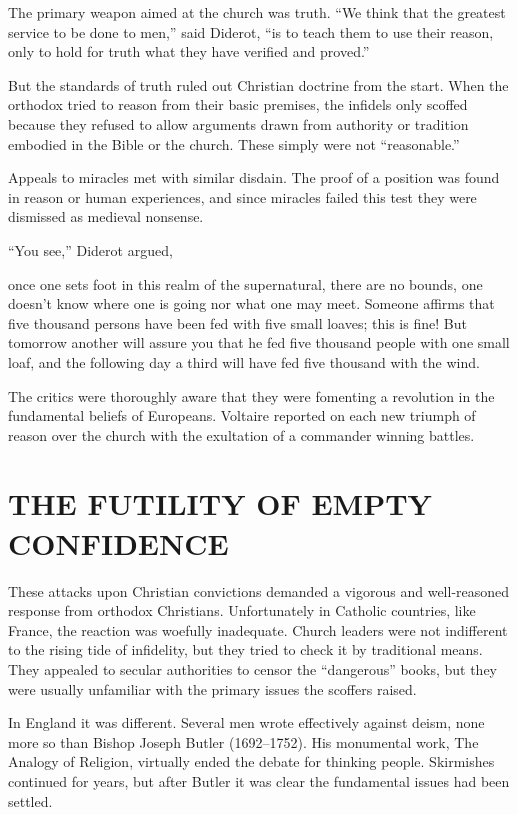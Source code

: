The primary weapon aimed at the church was truth. “We think that the greatest service to be done to
men,” said Diderot, “is to teach them to use their reason, only to hold for truth what they have
verified and proved.”

But the standards of truth ruled out Christian doctrine from the start. When the orthodox tried to
reason from their basic premises, the infidels only scoffed because they refused to allow arguments
drawn from authority or tradition embodied in the Bible or the church. These simply were not
“reasonable.”

Appeals to miracles met with similar disdain. The proof of a position was found in reason or human
experiences, and since miracles failed this test they were dismissed as medieval nonsense.

“You see,” Diderot argued,

\begin{blockquote}
once one sets foot in this realm of the supernatural, there are no bounds, one doesn’t know where
one is going nor what one may meet. Someone affirms that five thousand persons have been fed with
five small loaves; this is fine! But tomorrow another will assure you that he fed five thousand
people with one small loaf, and the following day a third will have fed five thousand with the wind.
\end{blockquote}

The critics were thoroughly aware that they were fomenting a revolution in the fundamental beliefs
of Europeans. Voltaire reported on each new triumph of reason over the church with the exultation of
a commander winning battles.

\section{THE FUTILITY OF EMPTY CONFIDENCE}

These attacks upon Christian convictions demanded a vigorous and well-reasoned response from
orthodox Christians. Unfortunately in Catholic countries, like France, the reaction was woefully
inadequate. Church leaders were not indifferent to the rising tide of infidelity, but they tried to
check it by traditional means. They appealed to secular authorities to censor the “dangerous” books,
but they were usually unfamiliar with the primary issues the scoffers raised.

In England it was different. Several men wrote effectively against deism, none more so than Bishop
Joseph Butler (1692–1752). His monumental work, The Analogy of Religion, virtually ended the debate
for thinking people. Skirmishes continued for years, but after Butler it was clear the fundamental
issues had been settled.

